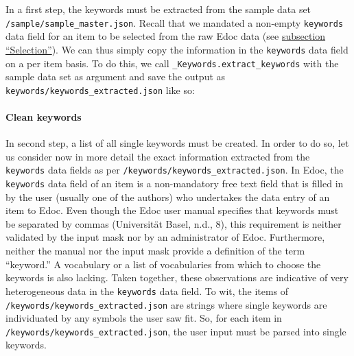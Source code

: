 In a first step, the keywords must be extracted from the sample data set
\texttt{/sample/sample\_master.json}. Recall that we mandated a
non-empty \texttt{keywords} data field for an item to be selected from
the raw Edoc data (see \protect\hyperlink{selection}{subsection
``Selection''}). We can thus simply copy the information in the
\texttt{keywords} data field on a per item basis. To do this, we call
\texttt{\_Keywords.extract\_keywords} with the sample data set as
argument and save the output as
\texttt{keywords/keywords\_extracted.json} like so:

\begin{Shaded}
\begin{Highlighting}[]
\OperatorTok{=}\OperatorTok{+} \NormalTok{)}
\OperatorTok{+} \NormalTok{)}
\end{Highlighting}
\end{Shaded}

\hypertarget{clean-keywords}{%
\paragraph{Clean keywords}\label{clean-keywords}}

In second step, a list of all single keywords must be created. In order
to do so, let us consider now in more detail the exact information
extracted from the \texttt{keywords} data fields as per
\texttt{/keywords/keywords\_extracted.json}. In Edoc, the
\texttt{keywords} data field of an item is a non-mandatory free text
field that is filled in by the user (usually one of the authors) who
undertakes the data entry of an item to Edoc. Even though the Edoc user
manual specifies that keywords must be separated by commas (Universität
Basel, n.d., 8), this requirement is neither validated by the input mask
nor by an administrator of Edoc. Furthermore, neither the manual nor the
input mask provide a definition of the term ``keyword.'' A vocabulary or
a list of vocabularies from which to choose the keywords is also
lacking. Taken together, these observations are indicative of very
heterogeneous data in the \texttt{keywords} data field. To wit, the
items of \texttt{/keywords/keywords\_extracted.json} are strings where
single keywords are individuated by any symbols the user saw fit. So,
for each item in \texttt{/keywords/keywords\_extracted.json}, the user
input must be parsed into single keywords.


